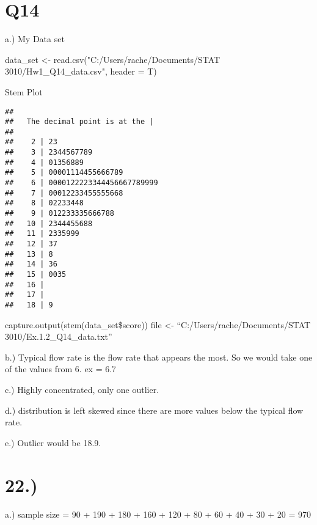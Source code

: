 \documentclass[
]{article}
\newenvironment{Shaded}{\begin{snugshade}}{\end{snugshade}}
\newcommand{\AttributeTok}[1]{\textcolor[rgb]{0.77,0.63,0.00}{#1}}
\newcommand{\FunctionTok}[1]{\textcolor[rgb]{0.00,0.00,0.00}{#1}}
\newcommand{\NormalTok}[1]{#1}
\newcommand{\OtherTok}[1]{\textcolor[rgb]{0.56,0.35,0.01}{#1}}
\newcommand{\SpecialCharTok}[1]{\textcolor[rgb]{0.00,0.00,0.00}{#1}}
\newcommand{\StringTok}[1]{\textcolor[rgb]{0.31,0.60,0.02}{#1}}
\begin{document}
\hypertarget{q14}{%
\section{Q14}\label{q14}}

a.) My Data set

\begin{Shaded}
\begin{Highlighting}[]
\NormalTok{data\_set }\OtherTok{\textless{}{-}} \FunctionTok{read.csv}\NormalTok{(}\StringTok{"C:/Users/rache/Documents/STAT 3010/Hw1\_Q14\_data.csv"}\NormalTok{, }\AttributeTok{header =}\NormalTok{ T)}
\end{Highlighting}
\end{Shaded}

Stem Plot

\begin{Shaded}
\end{Shaded}

\begin{verbatim}
## 
##   The decimal point is at the |
## 
##    2 | 23
##    3 | 2344567789
##    4 | 01356889
##    5 | 00001114455666789
##    6 | 0000122223344456667789999
##    7 | 00012233455555668
##    8 | 02233448
##    9 | 012233335666788
##   10 | 2344455688
##   11 | 2335999
##   12 | 37
##   13 | 8
##   14 | 36
##   15 | 0035
##   16 | 
##   17 | 
##   18 | 9
\end{verbatim}

capture.output(stem(data\_set\$score)) file \textless-
``C:/Users/rache/Documents/STAT 3010/Ex.1.2\_Q14\_data.txt''

b.) Typical flow rate is the flow rate that appears the most. So we
would take one of the values from 6. ex = 6.7

c.) Highly concentrated, only one outlier.

d.) distribution is left skewed since there are more values below the
typical flow rate.

e.) Outlier would be 18.9.

\hypertarget{section}{%
\section{22.)}\label{section}}

a.) sample size = 90 + 190 + 180 + 160 + 120 + 80 + 60 + 40 + 30 + 20 =
970
\end{document}
